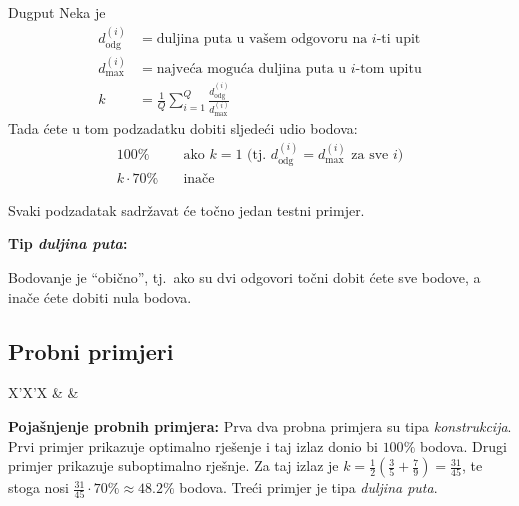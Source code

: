\begin{statement}[
  problempoints=100,
  timelimit=1 sekunda,
  memorylimit=512 MiB,
]{Dugput}
Neka je
\begin{align*}
    d_\mathrm{odg}^{(i)} &= \text{duljina puta u vašem odgovoru na $i$-ti upit} \\ 
    d_\mathrm{max}^{(i)} &= \text{najveća moguća duljina puta u $i$-tom upitu} \\
    k &= \frac{1}{Q} \sum_{i=1}^Q \frac{d_\mathrm{odg}^{(i)}}{d_\mathrm{max}^{(i)}}
\end{align*}
Tada ćete u tom podzadatku dobiti sljedeći udio bodova:
\begin{align*}
    100\% &\quad \text{ako $k = 1$ (tj.\ $d_\mathrm{odg}^{(i)} = d_\mathrm{max}^{(i)}$ za sve $i$)} \\
    k \cdot 70\% &\quad \text{inače}
\end{align*}

Svaki podzadatak sadržavat će točno jedan testni primjer.

\textbf{Tip \textit{duljina puta}:}

Bodovanje je ``obično'', tj.\ ako su dvi odgovori točni dobit ćete sve bodove,
a inače ćete dobiti nula bodova.

\subsection*{Probni primjeri}
\begin{tabularx}{\textwidth}{X'X'X}
 &
 &
\end{tabularx}

\textbf{Pojašnjenje probnih primjera:}
Prva dva probna primjera su tipa \textit{konstrukcija}.
Prvi primjer prikazuje optimalno rješenje i taj izlaz donio bi $100\%$ bodova.
Drugi primjer prikazuje suboptimalno rješnje. Za taj izlaz je $k = \frac{1}{2} (\frac{3}{5} + \frac{7}{9}) = \frac{31}{45}$, te stoga nosi $\frac{31}{45} \cdot 70\% \approx 48.2\%$ bodova.
Treći primjer je tipa \textit{duljina puta}.


\end{statement}

